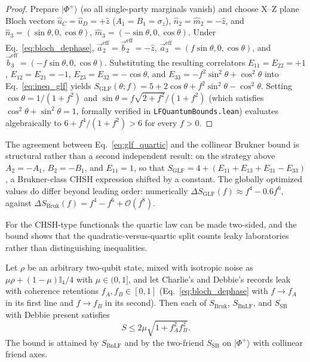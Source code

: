 \begin{proof}
Prepare $|\Phi^+\rangle$ (so all single-party marginals vanish) and choose X--Z plane Bloch vectors $\hat{u}_C = \hat{u}_D = +\hat{z}$ ($A_1 = B_1 = \sigma_z$), $\hat{n}_2 = \hat{m}_2 = -\hat{z}$, and $\hat{n}_3 = (\sin\theta, 0, \cos\theta)$, $\hat{m}_3 = (-\sin\theta, 0, \cos\theta)$. Under Eq.~\eqref{eq:bloch_dephase}, $\vec{a}_2^{\mathrm{eff}} = \vec{b}_2^{\mathrm{eff}} = -\hat{z}$, $\vec{a}_3^{\mathrm{eff}} = (f\sin\theta, 0, \cos\theta)$, and $\vec{b}_3^{\mathrm{eff}} = (-f\sin\theta, 0, \cos\theta)$. Substituting the resulting correlators $E_{11} = E_{22} = +1$, $E_{12} = E_{21} = -1$, $E_{23} = E_{32} = -\cos\theta$, and $E_{33} = -f^2\sin^2\theta + \cos^2\theta$ into Eq.~\eqref{eq:ineq_glf} yields $S_{\mathrm{GLF}}(\theta; f) = 5 + 2\cos\theta + f^2\sin^2\theta - \cos^2\theta$. Setting $\cos\theta = 1/(1 + f^2)$ and $\sin\theta = f\sqrt{2 + f^2}/(1 + f^2)$ (which satisfies $\cos^2\theta + \sin^2\theta = 1$, formally verified in \texttt{LFQuantumBounds.lean}) evaluates algebraically to $6 + f^4/(1 + f^2) > 6$ for every $f > 0$.
\end{proof}

The agreement between Eq.~\eqref{eq:glf_quartic} and the collinear Brukner bound is structural rather than a second independent result: on the strategy above $A_2 = -A_1$, $B_2 = -B_1$, and $E_{11} = 1$, so that $S_{\mathrm{GLF}} = 4 + (E_{11} + E_{13} + E_{31} - E_{33})$, a Brukner-class CHSH expression shifted by a constant. The globally optimized values do differ beyond leading order: numerically $\Delta S_{\mathrm{GLF}}(f) \approx f^4 - 0.6 f^6$, against $\Delta S_{\mathrm{Bruk}}(f) = f^4 - f^6 + \mathcal{O}(f^8)$.

For the CHSH-type functionals the quartic law can be made two-sided, and the bound shows that the quadratic-versus-quartic split counts leaky laboratories rather than distinguishing inequalities.

\begin{proposition}
\label{prop:bilateral}
Let $\rho$ be an arbitrary two-qubit state, mixed with isotropic noise as $\mu\rho + (1 - \mu)\mathbb{I}_4/4$ with $\mu \in (0, 1]$, and let Charlie's and Debbie's records leak with coherence retentions $f_A, f_B \in [0, 1]$ (Eq.~\eqref{eq:bloch_dephase} with $f \to f_A$ in its first line and $f \to f_B$ in its second). Then each of $S_{\mathrm{Bruk}}$, $S_{\mathrm{BnLF}}$, and $S_{\mathrm{SB}}$ with Debbie present satisfies
\begin{equation}
    S \le 2\mu\sqrt{1 + f_A^2 f_B^2}.
    \label{eq:bilateral_bound}
\end{equation}
The bound is attained by $S_{\mathrm{BnLF}}$ and by the two-friend $S_{\mathrm{SB}}$ on $|\Phi^+\rangle$ with collinear friend axes.
\end{proposition}

